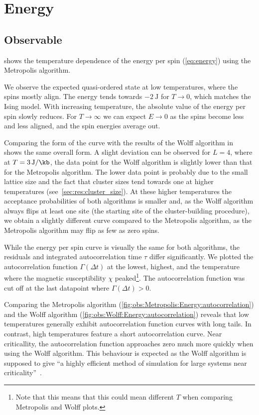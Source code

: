 \section{Energy}
	\subsection{Observable}
		 shows the temperature dependence of the energy per spin (\cref{eq:energy}) using the Metropolis algorithm.
		
		We observe the expected quasi-ordered state at low temperatures, where the spins mostly align. The energy tends towards $\SI{-2}{\joule}$ for $T\rightarrow 0$, which matches the Ising model. With increasing temperature, the absolute value of the energy per spin slowly reduces. For $T \rightarrow \infty$ we can expect $E \rightarrow 0$ as the spins become less and less aligned, and the spin energies average out.
		
		Comparing the form of the curve with the results of the Wolff algorithm in~ shows the same overall form. A slight deviation can be observed for $L = 4$, where at $T = \SI{3}{\joule\per\kb}$, the data point for the Wolff algorithm is slightly lower than that for the Metropolis algorithm. The lower data point is probably due to the small lattice size and the fact that cluster sizes tend towards one at higher temperatures (see~\cref{sec:res:cluster_size}). At these higher temperatures the acceptance probabilities of both algorithms is smaller and, as the Wolff algorithm always flips at least one site (the starting site of the cluster-building procedure), we obtain a slightly different curve compared to the Metropolis algorithm, as the Metropolis algorithm may flip as few as zero spins.
		
		While the energy per spin curve is visually the same for both algorithms, the residuals and integrated autocorrelation time $\tau$ differ significantly. We plotted the autocorrelation function $\Gamma(\Delta t)$ at the lowest, highest, and the temperature where  the magnetic susceptibility $\chi$ peaked\footnote{Note that this means that this could mean different $T$ when comparing Metropolis and Wolff plots.}. The autocorrelation function was cut off at the last datapoint where $\Gamma(\Delta t) > \num{0}$.
		
		Comparing the Metropolis algorithm (\cref{fig:obs:Metropolis:Energy:autocorrelation}) and the Wolff algorithm (\cref{fig:obs:Wolff:Energy:autocorrelation}) reveals that low temperatures generally exhibit autocorrelation function curves with long tails. In contrast, high temperatures feature a short autocorrelation curve. Near criticallity, the autocorrelation function approaches zero much more quickly when using the Wolff algorithm. This behaviour is expected as the Wolff algorithm is supposed to give \enquote{a highly efficient method of simulation for large systems near criticality}~\citep*{sw}.
		
